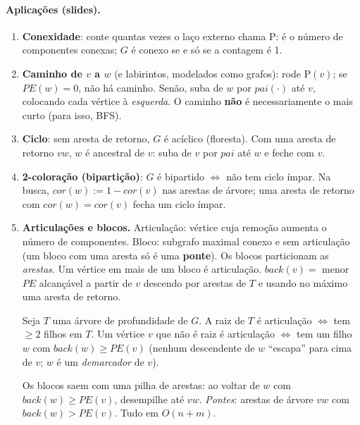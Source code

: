 \paragraph{Aplicações (slides).}
\begin{enumerate}
  \item \textbf{Conexidade}: conte quantas vezes o laço externo chama \textsc{P}: é o número de componentes conexas; $G$ é conexo se e só se a contagem é 1.
  \item \textbf{Caminho de $v$ a $w$} (e labirintos, modelados como grafos): rode \textsc{P}$(v)$; se $PE(w)=0$, não há caminho. Senão, suba de $w$ por $pai(\cdot)$ até $v$, colocando cada vértice à \emph{esquerda}. O caminho \textbf{não} é necessariamente o mais curto (para isso, BFS).
  \item \textbf{Ciclo}: sem aresta de retorno, $G$ é acíclico (floresta). Com uma aresta de retorno $vw$, $w$ é ancestral de $v$: suba de $v$ por $pai$ até $w$ e feche com $v$.
  \item \textbf{2-coloração (bipartição)}: $G$ é bipartido $\iff$ não tem ciclo ímpar. Na busca, $cor(w):=1-cor(v)$ nas arestas de árvore; uma aresta de retorno com $cor(w)=cor(v)$ fecha um ciclo ímpar.
  \item \textbf{Articulações e blocos.} Articulação: vértice cuja remoção aumenta o número de componentes. Bloco: subgrafo maximal conexo e sem articulação (um bloco com uma aresta só é uma \textbf{ponte}). Os blocos particionam as \emph{arestas}. Um vértice em mais de um bloco é articulação.
  $back(v)=$ menor $PE$ alcançável a partir de $v$ descendo por arestas de $T$ e usando no máximo uma aresta de retorno.
  \begin{teo}
  Seja $T$ uma árvore de profundidade de $G$. A raiz de $T$ é articulação $\iff$ tem $\ge2$ filhos em $T$. Um vértice $v$ que não é raiz é articulação $\iff$ tem um filho $w$ com $back(w)\ge PE(v)$ (nenhum descendente de $w$ ``escapa'' para cima de $v$; $w$ é um \emph{demarcador} de $v$).
  \end{teo}
  Os blocos saem com uma pilha de arestas: ao voltar de $w$ com $back(w)\ge PE(v)$, desempilhe até $vw$. \emph{Pontes}: arestas de árvore $vw$ com $back(w)>PE(v)$. Tudo em $O(n+m)$.
\end{enumerate}

